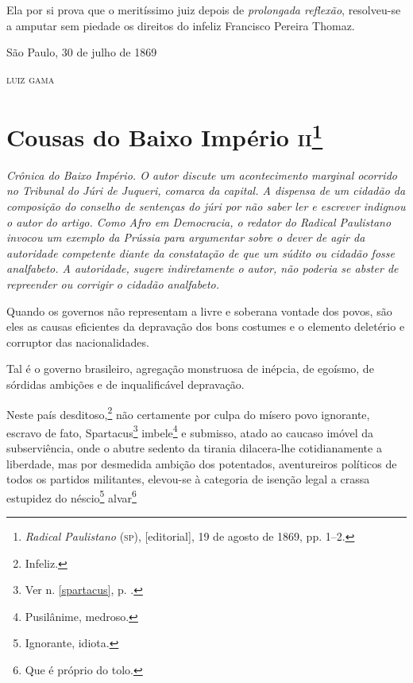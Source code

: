 Ela por si prova que o meritíssimo juiz depois de \emph{prolongada
reflexão}, resolveu-se a amputar sem piedade os direitos do infeliz
Francisco Pereira Thomaz.

\begin{flushright}
São Paulo, 30 de julho de 1869

\textsc{luiz gama}
\end{flushright}

\chapter{Cousas do Baixo Império \textsc{ii}\footnote{\emph{Radical
  Paulistano} (\textsc{sp}), {[}editorial{]}, 19 de agosto de 1869, pp. 1--2.}}

\begin{didascalia}\itshape
Crônica do Baixo Império. O autor discute um acontecimento marginal
ocorrido no Tribunal do Júri de Juqueri, comarca da capital. A dispensa
de um cidadão da composição do conselho de sentenças do júri por não
saber ler e escrever indignou o autor do artigo. Como Afro em
\textnormal{Democracia}, o redator do \textnormal{Radical Paulistano} invocou um
exemplo da Prússia para argumentar sobre o dever de agir da autoridade
competente diante da constatação de que um súdito ou cidadão fosse
analfabeto. A autoridade, sugere indiretamente o autor, não poderia se
abster de repreender ou corrigir o cidadão analfabeto.
\end{didascalia}



Quando os governos não representam a livre e soberana vontade dos povos,
são eles as causas eficientes da depravação dos bons costumes e o
elemento deletério e corruptor das nacionalidades.

Tal é o governo brasileiro, agregação monstruosa de inépcia, de egoísmo,
de sórdidas ambições e de inqualificável depravação.

Neste país desditoso,\footnote{Infeliz.} não certamente por culpa do
mísero povo ignorante, escravo de fato, Spartacus\footnote{Ver n. \ref{spartacus}, 
p. \pageref{spartacus}.} imbele\footnote{Pusilânime, medroso.} e
submisso, atado ao caucaso imóvel da subserviência, onde o abutre %
sedento da tirania dilacera-lhe cotidianamente a liberdade, mas por
desmedida ambição dos potentados, aventureiros políticos de todos os
partidos militantes, elevou-se à categoria de isenção legal a crassa
estupidez do néscio\footnote{Ignorante, idiota.} alvar\footnote{Que
  é próprio do tolo.}

